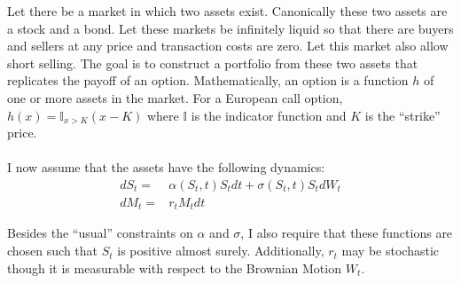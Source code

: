\documentclass{article}
\begin{document}
Let there be a market in which two assets exist.  Canonically these two assets are a stock and a bond.  Let these markets be infinitely liquid so that there are buyers and sellers at any price and transaction costs are zero.  Let this market also allow short selling. The goal is to construct a portfolio from these two assets that replicates the payoff of an option.  Mathematically, an option is a function \(h\) of one or more assets in the market.  For a European call option, \(h(x)=\mathbb{I}_{x>K}(x-K)\) where \(\mathbb{I}\) is the indicator function and \(K\) is the ``strike'' price.  
\\
\\
I now assume that the assets have the following dynamics:
\begin{equation}\label{eq1}
\begin{aligned}
dS_t = & \alpha(S_t, t) S_t dt+\sigma(S_t, t) S_t dW_t\\
dM_t = & r_t M_t dt
\end{aligned}
\end{equation}	

Besides the ``usual'' constraints on \(\alpha\) and \(\sigma\), I also require that these functions are chosen such that \(S_t\) is positive almost surely.  Additionally, \(r_t\) may be stochastic though it is measurable with respect to the Brownian Motion \(W_t\).
\end{document}
